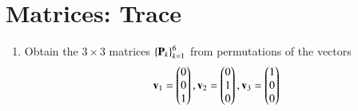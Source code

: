 \documentclass[journal,12pt,twocolumn]{IEEEtran}
\renewcommand\thesection{\arabic{section}}
\begin{document}
\section{Matrices: Trace}
\begin{enumerate}[label=\thesection.\arabic*
,ref=\thesection.\theenumi]
\item Obtain the  $3 \times 3$ matrices $\left\{\mathbf{P}_k\right\}_{k=1}^{6}$ from permutations of the  vectors
\begin{align}
\mathbf{v}_1 = \begin{pmatrix}0 \\ 0 \\ 1\end{pmatrix},
\mathbf{v}_2 = \begin{pmatrix}0 \\ 1 \\ 0\end{pmatrix},
\mathbf{v}_3 = \begin{pmatrix}1 \\ 0 \\ 0\end{pmatrix}
\end{align}
%
%


\end{enumerate}
\end{document}
